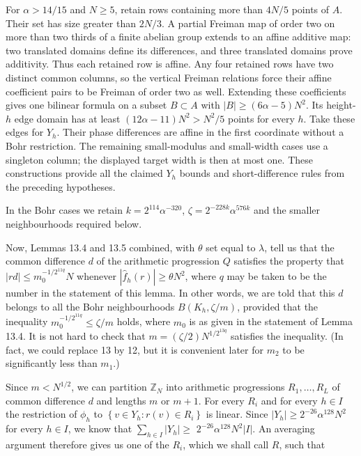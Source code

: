 \documentclass[10pt]{article}
\begin{document}
For $\alpha>14/15$ and $N\geqslant5$, retain rows containing more than $4N/5$
points of $A$. Their set has size greater than $2N/3$. A partial Freiman map
of order two on more than two thirds of a finite abelian group extends to an
affine additive map: two translated domains define its differences, and three
translated domains prove additivity. Thus each retained row is affine.
Any four retained rows have two distinct common columns, so the vertical
Freiman relations force their affine coefficient pairs to be Freiman of
order two as well. Extending these coefficients gives one bilinear formula
on a subset $B\subset A$ with $|B|\geqslant(6\alpha-5)N^2$. Its height-$h$
edge domain has at least $(12\alpha-11)N^2>N^2/5$ points for every $h$.
Take these edges for $Y_h$. Their phase differences are affine in the first
coordinate without a Bohr restriction. The remaining small-modulus and
small-width cases use a singleton column; the displayed target width is
then at most one. These constructions provide all the claimed $Y_h$ bounds
and short-difference rules from the preceding hypotheses.

In the Bohr cases we retain $k=2^{114}\alpha^{-320}$,
$\zeta=2^{-228k}\alpha^{576k}$ and the smaller neighbourhoods required below.

Now, Lemmas 13.4 and 13.5 combined, with $\theta$ set equal to $\lambda$, tell us that the common difference $d$ of the arithmetic progression $Q$ satisfies the property that $|r d| \leqslant m_{0}^{-1 / 2^{11 q}} N$ whenever $\left|\hat{f}_{h}(r)\right| \geqslant \theta N^{2}$, where $q$ may be taken to be the number in the statement of this lemma. In other words, we are told that this $d$ belongs to all the Bohr neighbourhoods $B\left(K_{h}, \zeta / m\right)$, provided that the inequality $m_{0}^{-1 / 2^{11 q}} \leqslant \zeta / m$ holds, where $m_{0}$ is as given in the statement of Lemma 13.4. It is not hard to check that $m=(\zeta / 2) N^{1 / 2^{13 q}}$ satisfies the inequality. (In fact, we could replace 13 by 12, but it is convenient later for $m_{2}$ to be significantly less than $m_{1}$.)

Since $m<N^{1 / 2}$, we can partition $\mathbb{Z}_{N}$ into arithmetic progressions $R_{1}, \ldots, R_{L}$ of common difference $d$ and lengths $m$ or $m+1$. For every $R_{i}$ and for every $h \in I$ the restriction of $\phi_{h}$ to $\left\{v \in Y_{h}: r(v) \in R_{i}\right\}$ is linear. Since $\left|Y_{h}\right| \geqslant 2^{-26} \alpha^{128} N^{2}$ for every $h \in I$, we know that $\sum_{h \in I}\left|Y_{h}\right| \geqslant$ $2^{-26} \alpha^{128} N^{2}|I|$. An averaging argument therefore gives us one of the $R_{i}$, which we shall call $R$, such that
\end{document}
